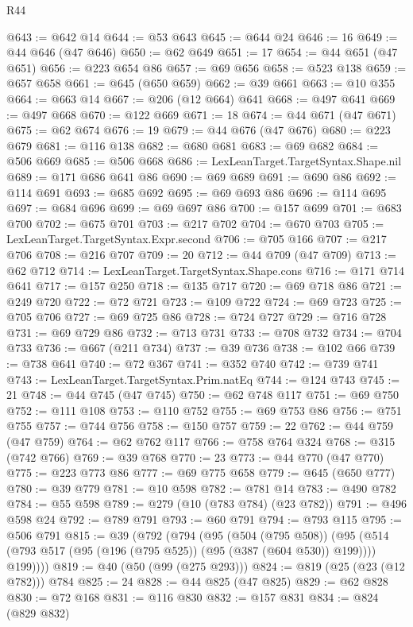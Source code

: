 \begin{lexlean}{R44}
\begin{coremodule}
@643 := @642 @14
@644 := @53 @643
@645 := @644 @24
@646 := 16
@649 := @44 @646 (@47 @646)
@650 := @62 @649
@651 := 17
@654 := @44 @651 (@47 @651)
@656 := @223 @654 @86
@657 := @69 @656
@658 := @523 @138
@659 := @657 @658
@661 := @645 (@650 @659)
@662 := @39 @661
@663 := @10 @355
@664 := @663 @14
@667 := @206 (@12 @664) @641
@668 := @497 @641
@669 := @497 @668
@670 := @122 @669
@671 := 18
@674 := @44 @671 (@47 @671)
@675 := @62 @674
@676 := 19
@679 := @44 @676 (@47 @676)
@680 := @223 @679
@681 := @116 @138
@682 := @680 @681
@683 := @69 @682
@684 := @506 @669
@685 := @506 @668
@686 := LexLeanTarget.TargetSyntax.Shape.nil
@689 := @171 @686 @641 @86
@690 := @69 @689
@691 := @690 @86
@692 := @114 @691
@693 := @685 @692
@695 := @69 @693 @86
@696 := @114 @695
@697 := @684 @696
@699 := @69 @697 @86
@700 := @157 @699
@701 := @683 @700
@702 := @675 @701
@703 := @217 @702
@704 := @670 @703
@705 := LexLeanTarget.TargetSyntax.Expr.second
@706 := @705 @166
@707 := @217 @706
@708 := @216 @707
@709 := 20
@712 := @44 @709 (@47 @709)
@713 := @62 @712
@714 := LexLeanTarget.TargetSyntax.Shape.cons
@716 := @171 @714 @641
@717 := @157 @250
@718 := @135 @717
@720 := @69 @718 @86
@721 := @249 @720
@722 := @72 @721
@723 := @109 @722
@724 := @69 @723
@725 := @705 @706
@727 := @69 @725 @86
@728 := @724 @727
@729 := @716 @728
@731 := @69 @729 @86
@732 := @713 @731
@733 := @708 @732
@734 := @704 @733
@736 := @667 (@211 @734)
@737 := @39 @736
@738 := @102 @66
@739 := @738 @641
@740 := @72 @367
@741 := @352 @740
@742 := @739 @741
@743 := LexLeanTarget.TargetSyntax.Prim.natEq
@744 := @124 @743
@745 := 21
@748 := @44 @745 (@47 @745)
@750 := @62 @748 @117
@751 := @69 @750
@752 := @111 @108
@753 := @110 @752
@755 := @69 @753 @86
@756 := @751 @755
@757 := @744 @756
@758 := @150 @757
@759 := 22
@762 := @44 @759 (@47 @759)
@764 := @62 @762 @117
@766 := @758 @764 @324
@768 := @315 (@742 @766)
@769 := @39 @768
@770 := 23
@773 := @44 @770 (@47 @770)
@775 := @223 @773 @86
@777 := @69 @775 @658
@779 := @645 (@650 @777)
@780 := @39 @779
@781 := @10 @598
@782 := @781 @14
@783 := @490 @782
@784 := @55 @598
@789 := @279 (@10 (@783 @784) (@23 @782))
@791 := @496 @598 @24
@792 := @789 @791
@793 := @60 @791
@794 := @793 @115
@795 := @506 @791
@815 := @39
    (@792
      (@794
        (@95
          (@504 (@795 @508))
          (@95 (@514 (@793 @517 (@95 (@196 (@795 @525)) (@95 (@387 (@604 @530)) @199)))) @199))))
@819 := @40 (@50 (@99 (@275 @293)))
@824 := @819 (@25 (@23 (@12 @782))) @784
@825 := 24
@828 := @44 @825 (@47 @825)
@829 := @62 @828
@830 := @72 @168
@831 := @116 @830
@832 := @157 @831
@834 := @824 (@829 @832)

\end{coremodule}
\end{lexlean}
